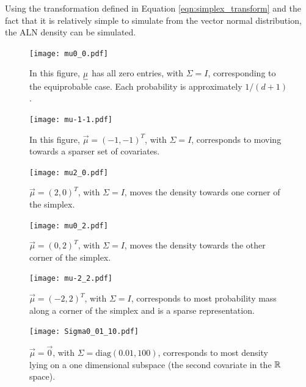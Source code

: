 Using the transformation defined in Equation \ref{eqn:simplex_transform} and the fact that it is relatively simple to simulate from the vector normal distribution, the ALN density can be simulated. 

\begin{figure}[ht]
\begin{minipage}[b]{0.45\linewidth}
\centering
\texttt{[image: mu0\_0.pdf]}
\caption[ALN plot with a zero mean vector]{In this figure, $\underline{\mu}$ has all zero entries, with $\Sigma=I$, corresponding to the equiprobable case. Each probability is approximately $1/(d+1)$. }
\label{fig:figure9}
\end{minipage}
\hspace{0.5cm}
\begin{minipage}[b]{0.45\linewidth}
\centering
\texttt{[image: mu-1-1.pdf]}
\caption[ALN plot with a negative one mean vector]{In this figure, $\vec{\mu}=(-1,-1)^T$, with $\Sigma=I$, corresponds to moving towards a sparser set of covariates. }
\label{fig:figure10}
\end{minipage}
\end{figure}

\begin{figure}[ht]
\begin{minipage}[b]{0.45\linewidth}
\centering
\texttt{[image: mu2\_0.pdf]}
\caption[ALN plot with a mean vector $(2,0)^{T}$]{$\vec{\mu}=(2,0)^T$, with $\Sigma=I$, moves the density towards one corner of the simplex. }
\label{fig:figure1}
\end{minipage}
\hspace{0.5cm}
\begin{minipage}[b]{0.45\linewidth}
\centering
\texttt{[image: mu0\_2.pdf]}
\caption[ALN plot with mean vector $(2,0)^{T}$]{$\vec{\mu}=(0,2)^T$, with $\Sigma=I$, moves the density towards the other corner of the simplex. }
\label{fig:figur2}
\end{minipage}
\end{figure}

\begin{figure}[ht]
\begin{minipage}[b]{0.45\linewidth}
\centering
\texttt{[image: mu-2\_2.pdf]}
\caption[ALN plot with a mean vector of $(-2,2)^{T}$]{$\vec{\mu}=(-2,2)^T$, with $\Sigma=I$, corresponds to most probability mass along a corner of the simplex and is a sparse representation.} 
\label{fig:figure3}
\end{minipage}
\hspace{0.5cm}
\begin{minipage}[b]{0.45\linewidth}
\centering
\texttt{[image: Sigma0\_01\_10.pdf]}
\caption[ALN plot $\Sigma=\text{Diag(0.01,100)}$]{ $\vec{\mu}=\vec{0}$, with
 $\Sigma= \text{diag}(0.01, 100)$, corresponds to most density lying on a one dimensional subspace (the second covariate in the $\mathbb{R}^{\ }$ space).  }
\label{fig:figure4}
\end{minipage}
\end{figure}


